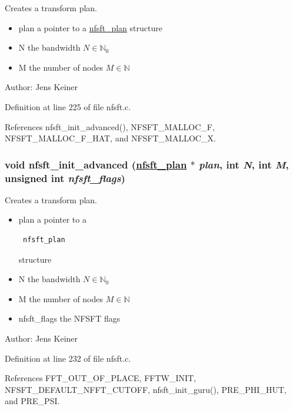 Creates a transform plan. 

\begin{itemize}
\item plan a pointer to a \hyperlink{structnfsft__plan}{nfsft\_\-plan} structure \item N the bandwidth $N \in \mathbb{N}_0$ \item M the number of nodes $M \in \mathbb{N}$\end{itemize}
\begin{Desc}
\item[Author:]Jens Keiner \end{Desc}


Definition at line 225 of file nfsft.c.

References nfsft\_\-init\_\-advanced(), NFSFT\_\-MALLOC\_\-F, NFSFT\_\-MALLOC\_\-F\_\-HAT, and NFSFT\_\-MALLOC\_\-X.\hypertarget{group__nfsft_ga2}{
\subsubsection[nfsft\_\-init\_\-advanced]{\setlength{\rightskip}{0pt plus 5cm}void nfsft\_\-init\_\-advanced (\hyperlink{structnfsft__plan}{nfsft\_\-plan} $\ast$ {\em plan}, int {\em N}, int {\em M}, unsigned int {\em nfsft\_\-flags})}}
\label{group__nfsft_ga2}


Creates a transform plan. 

\begin{itemize}
\item plan a pointer to a 

\footnotesize\begin{verbatim} nfsft_plan \end{verbatim}
\normalsize
 structure \item N the bandwidth $N \in \mathbb{N}_0$ \item M the number of nodes $M \in \mathbb{N}$ \item nfsft\_\-flags the NFSFT flags\end{itemize}
\begin{Desc}
\item[Author:]Jens Keiner \end{Desc}


Definition at line 232 of file nfsft.c.

References FFT\_\-OUT\_\-OF\_\-PLACE, FFTW\_\-INIT, NFSFT\_\-DEFAULT\_\-NFFT\_\-CUTOFF, nfsft\_\-init\_\-guru(), PRE\_\-PHI\_\-HUT, and PRE\_\-PSI.

